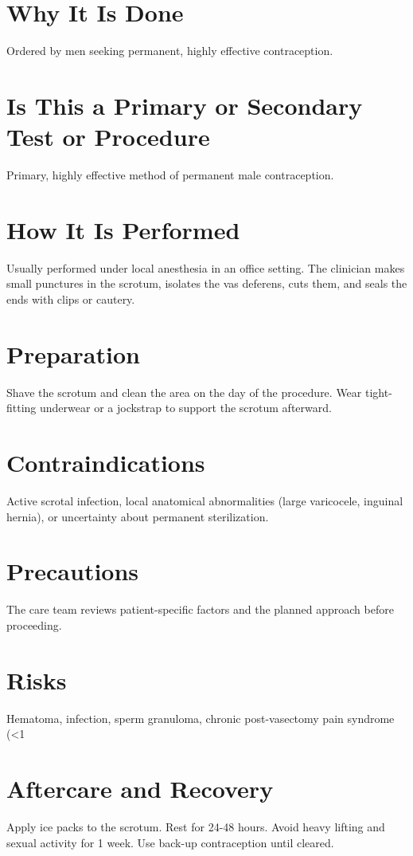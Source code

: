 \section*{Why It Is Done}
Ordered by men seeking permanent, highly effective contraception.

\section*{Is This a Primary or Secondary Test or Procedure}
Primary, highly effective method of permanent male contraception.

\section*{How It Is Performed}
Usually performed under local anesthesia in an office setting. The clinician makes small punctures in the scrotum, isolates the vas deferens, cuts them, and seals the ends with clips or cautery.

\section*{Preparation}
Shave the scrotum and clean the area on the day of the procedure. Wear tight-fitting underwear or a jockstrap to support the scrotum afterward.

\section*{Contraindications}
Active scrotal infection, local anatomical abnormalities (large varicocele, inguinal hernia), or uncertainty about permanent sterilization.

\section*{Precautions}
The care team reviews patient-specific factors and the planned approach before proceeding.

\section*{Risks}
Hematoma, infection, sperm granuloma, chronic post-vasectomy pain syndrome (<1%

\section*{Aftercare and Recovery}
Apply ice packs to the scrotum. Rest for 24-48 hours. Avoid heavy lifting and sexual activity for 1 week. Use back-up contraception until cleared.


